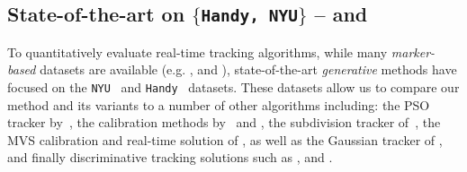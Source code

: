 \subsection{State-of-the-art on $\{$\texttt{Handy, NYU}$\}$ --
 and }
\label{sec:evalstar}
To quantitatively evaluate real-time tracking algorithms, while many \emph{marker-based} datasets are available (e.g. \cite{qian2014realtime}, \cite{sharp2015accurate} and \cite{yuan2017bighand}), 
state-of-the-art \emph{generative} methods have focused on the \texttt{NYU}~\cite{tompson2014real} and \texttt{Handy}~\cite{tkach2016sphere} datasets. These datasets allow us to compare our method and its variants to a number of other algorithms including: the PSO tracker by~\cite{sharp2015accurate}, the calibration methods by~\cite{khamis2015learning} and \cite{tan2016fits}, the subdivision tracker of~\cite{taylor2016joint}, the MVS calibration and real-time solution of \cite{tkach2016sphere}, as well as the Gaussian tracker of \cite{sridhar2015fast}, and finally discriminative tracking solutions such as  \cite{tompson2014real}, \cite{tang2015opening} and \cite{oberweger2015hands}.


